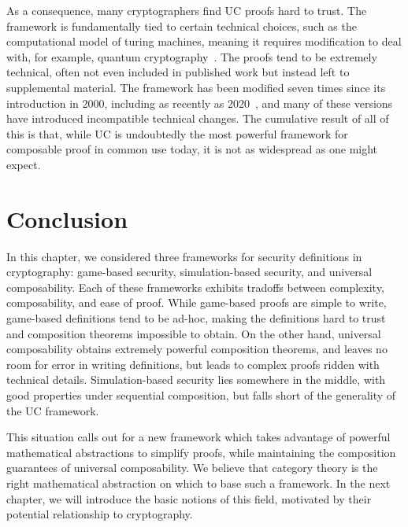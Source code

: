 As a consequence, many cryptographers find UC proofs hard to trust. The
framework is fundamentally tied to certain technical choices, such as the
computational model of turing machines, meaning it requires modification to
deal with, for example, quantum
cryptography~\cite{hofheinz-mullerquade-2003,unruh-2010}. The proofs tend to be
extremely technical, often not even included in published work but instead left
to supplemental material. The framework has been modified seven times since its
introduction in 2000, including as recently as 2020~\cite{canetti-2020}, and many of
these versions have introduced incompatible technical changes. The cumulative
result of all of this is that, while UC is undoubtedly the most powerful
framework for composable proof in common use today, it is not as widespread as
one might expect.

\section{Conclusion}

In this chapter, we considered three frameworks for security definitions in
cryptography: game-based security, simulation-based security, and universal
composability. Each of these frameworks exhibits tradoffs between complexity,
composability, and ease of proof. While game-based proofs are simple to write,
game-based definitions tend to be ad-hoc, making the definitions hard to trust
and composition theorems impossible to obtain. On the other hand, universal
composability obtains extremely powerful composition theorems, and leaves no
room for error in writing definitions, but leads to complex proofs ridden with
technical details. Simulation-based security lies somewhere in the middle, with
good properties under sequential composition, but falls short of the generality
of the UC framework.

This situation calls out for a new framework which takes advantage of powerful
mathematical abstractions to simplify proofs, while maintaining the composition
guarantees of universal composability. We believe that category theory is the
right mathematical abstraction on which to base such a framework. In the next
chapter, we will introduce the basic notions of this field, motivated by their
potential relationship to cryptography.
